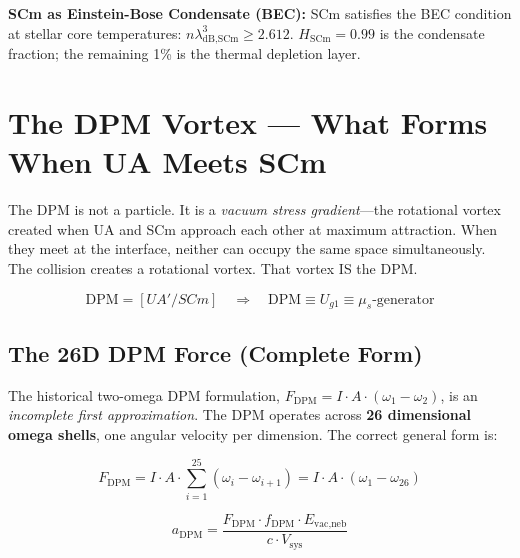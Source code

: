 \documentclass[12pt,a4paper]{article}
\begin{document}
\noindent\textbf{SCm as Einstein-Bose Condensate (BEC):}
SCm satisfies the BEC condition at stellar core temperatures:
$n\lambda_{\text{dB,SCm}}^3 \geq 2.612$.
$H_{\text{SCm}} = 0.99$ is the condensate fraction; the remaining 1\% is the
thermal depletion layer.

\section{The DPM Vortex --- What Forms When UA Meets SCm}
\label{sec:dpm_vortex}

The DPM is not a particle.  It is a \emph{vacuum stress gradient}---the
rotational vortex created when UA and SCm approach each other at maximum attraction.
When they meet at the interface, neither can occupy the same space simultaneously.
The collision creates a rotational vortex.  That vortex IS the DPM.

\begin{equation}
  \text{DPM} = [UA'/SCm]
  \quad\Longrightarrow\quad
  \text{DPM} \equiv U_{g1} \equiv \mu_s\text{-generator}
  \label{eq:dpm_identity}
\end{equation}

\subsection{The 26D DPM Force (Complete Form)}
\label{sec:dpm_26d_force}

The historical two-omega DPM formulation,
$F_{\text{DPM}} = I \cdot A \cdot (\omega_1 - \omega_2)$,
is an \emph{incomplete first approximation}.  The DPM operates across
\textbf{26 dimensional omega shells}, one angular velocity per dimension.
The correct general form is:

\begin{equation}
  \boxed{
  F_{\text{DPM}} = I \cdot A \cdot \sum_{i=1}^{25}(\omega_i - \omega_{i+1})
  = I \cdot A \cdot (\omega_1 - \omega_{26})
  }
  \label{eq:dpm_26d}
\end{equation}

\begin{equation}
  a_{\text{DPM}} = \frac{F_{\text{DPM}} \cdot f_{\text{DPM}} \cdot E_{\text{vac,neb}}}
    {c \cdot V_\text{sys}}
  \label{eq:adpm}
\end{equation}
\end{document}
